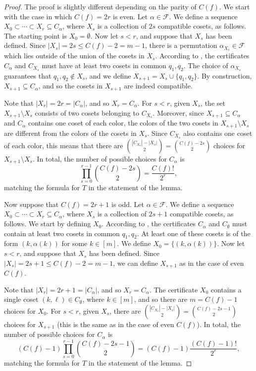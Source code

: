 \documentclass{article}
\theoremstyle{definition}
\begin{document}
\begin{proof}
The proof is slightly different depending on the parity of $C(f)$. We start with the case in which $C(f) = 2r$ is even. Let $\alpha \in \mathcal{F}$.
We define a sequence $X_0 \subset \cdots \subset X_r \subseteq C_\alpha$, where $X_s$ is a collection of $2s$ compatible cosets, as follows. The starting point is $X_0 = \emptyset$. Now let $s < r$, and suppose that $X_s$ has been defined.  Since $|X_s| = 2s \leq C(f) - 2 = m - 1$, there is a permutation $\alpha_{X_s} \in \mathcal{F}$ which lies outside of the union of the cosets in $X_s$. According to , the certificates $C_\alpha$ and $C_{X_s}$ must have at least two cosets in common $q_1,q_2$. The choice of $\alpha_{X_s}$ guarantees that $q_1,q_2 \notin X_s$, and we define $X_{s+1} = X_s \cup \{q_1,q_2\}$. By construction, $X_{s+1} \subseteq C_\alpha$, and so the cosets in $X_{s+1}$ are indeed compatible.

Note that $|X_r| = 2r = |C_\alpha|$, and so $X_r = C_\alpha$. For $s < r$, given $X_s$, the set $X_{s+1} \setminus X_s$ consists of two cosets belonging to $C_{X_s}$. Moreover, since $X_{s+1} \subseteq C_\alpha$ and $C_\alpha$ contains one coset of each color, the colors of the two cosets in $X_{s+1} \setminus X_s$ are different from the colors of the cosets in $X_s$. Since $C_{X_s}$ also contains one coset of each color, this means that there are $\binom{|C_{X_s}| - |X_s|}{2} = \binom{C(f) - 2s}{2}$ choices for $X_{s+1} \setminus X_s$. In total, the number of possible choices for $C_\alpha$ is
\[
 \prod_{s=0}^{r-1} \binom{C(f) - 2s}{2} =
 \frac{C(f)!}{2^r},
\]
matching the formula for $T$ in the statement of the lemma.

\smallskip

Now suppose that $C(f) = 2r+1$ is odd. Let $\alpha \in \mathcal{F}$. We define a sequence $X_0 \subset \cdots \subset X_r \subseteq C_\alpha$, where $X_s$ is a collection of $2s+1$ compatible cosets, as follows. We start by defining $X_0$. According to , the certificates $C_\alpha$ and $C_\emptyset$ must contain at least two cosets in common $q_1,q_2$. At least one of these cosets is of the form $(k,\alpha(k))$ for some $k \in [m]$. We define $X_0 = \{(k,\alpha(k))\}$. Now let $s < r$, and suppose that $X_s$ has been defined. Since $|X_s| = 2s+1 \leq C(f) - 2 = m - 1$, we can define $X_{s+1}$ as in the case of even $C(f)$.

Note that $|X_r| = 2r+1 = |C_\alpha|$, and so $X_r = C_\alpha$. The certificate $X_0$ contains a single coset $(k,\ell) \in C_\emptyset$, where $k \in [m]$, and so there are $m = C(f) - 1$ choices for $X_0$. For $s < r$, given $X_s$, there are $\binom{|C_{X_s}| - |X_s|}{2} = \binom{C(f) - 2s - 1}{2}$ choices for $X_{s+1}$ (this is the same as in the case of even $C(f)$). In total, the number of possible choices for $C_\alpha$ is
\[
 (C(f) - 1) \prod_{s=0}^{r-1} \binom{C(f) - 2s - 1}{2} =
 (C(f) - 1) \frac{(C(f) - 1)!}{2^r},
\]
matching the formula for $T$ in the statement of the lemma.
\end{proof}
\end{document}
